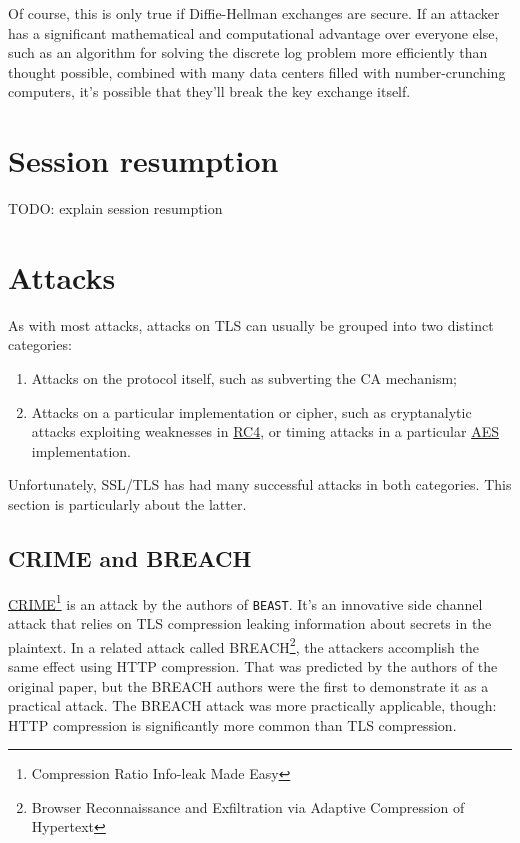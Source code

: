 \documentclass[11pt,ebook,table,dvipsnames]{memoir}
\begin{document}
Of course, this is only true if Diffie-Hellman exchanges are secure.
If an attacker has a significant mathematical and computational
advantage over everyone else, such as an algorithm for solving the
discrete log problem more efficiently than thought possible, combined
with many data centers filled with number-crunching computers, it's
possible that they'll break the key exchange itself.
\section{Session resumption}
\label{sec-3-1-7}

TODO: explain session resumption
\section{Attacks}
\label{sec-3-1-8}

As with most attacks, attacks on TLS can usually be grouped into two
distinct categories:

\begin{enumerate}
\item Attacks on the protocol itself, such as subverting the CA mechanism;
\item Attacks on a particular implementation or cipher, such as
cryptanalytic attacks exploiting weaknesses in \hyperref[RC4]{RC4}, or timing
attacks in a particular \hyperref[AES]{AES} implementation.
\end{enumerate}

Unfortunately, SSL/TLS has had many successful attacks in both
categories. This section is particularly about the latter.

\subsection{\label{CRIME}CRIME and BREACH}
\label{sec-3-1-8-1}

\hyperref[CRIME]{CRIME}\footnote{Compression Ratio Info-leak Made Easy} is an attack by the
authors of \texttt{BEAST}. It's an innovative side channel attack that relies
on TLS compression leaking information about secrets in the plaintext.
In a related attack called BREACH\footnote{Browser Reconnaissance and
Exfiltration via Adaptive Compression of Hypertext}, the attackers
accomplish the same effect using HTTP compression. That was predicted
by the authors of the original paper, but the BREACH authors were the
first to demonstrate it as a practical attack. The BREACH attack was
more practically applicable, though: HTTP compression is
significantly more common than TLS compression.
\end{document}
